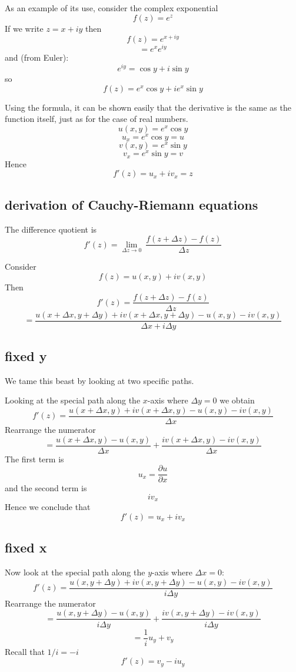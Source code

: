 \documentclass[11pt, oneside]{article}
\begin{document}
As an example of its use, consider the complex exponential
\[ f(z) = e^z \]
If we write $z = x + iy$ then
\[ f(z) = e^{x + iy} \]
\[ = e^x e^{iy} \]
and (from Euler):
\[ e^{iy} = \cos y + i \sin y \]
so
\[ f(z) = e^x \cos y + i e^x \sin y \]

Using the formula, it can be shown easily that the derivative is the same as the function itself, just as for the case of real numbers.
\[ u(x,y) = e^x \cos y \]
\[ u_x = e^x \cos y = u \]
\[ v(x,y) = e^x \sin y \]
\[ v_x = e^x \sin y = v \]
Hence
\[f'(z) = u_x + iv_x = z \]

\subsection*{derivation of Cauchy-Riemann equations}

The difference quotient is
\[ f'(z) = \lim_{\Delta z \rightarrow 0} \ \frac{f(z + \Delta z) - f(z)}{\Delta z} \]

Consider
\[ f(z) = u(x,y) + i v(x,y) \]
Then
\[ f'(z) = \frac{f(z + \Delta z) - f(z)}{\Delta z} \]
\[ = \frac{u(x + \Delta x, y + \Delta y) + i v (x + \Delta x, y + \Delta y) - u(x,y) - i v(x,y)}{\Delta x + i \Delta y} \]

\subsection*{fixed y}
We tame this beast by looking at two specific paths.

Looking at the special path along the $x$-axis where $\Delta y = 0$ we obtain
\[ f'(z) = \frac{u(x + \Delta x, y) + i v (x + \Delta x, y) - u(x,y) - i v(x,y)}{\Delta x} \]
Rearrange the numerator
\[ = \frac{u(x + \Delta x, y) - u(x,y)}{\Delta x} + \frac{i v (x + \Delta x, y) - i v(x,y)}{\Delta x} \]
The first term is
\[ u_x = \frac{\partial u}{\partial x} \]
and the second term is 
\[ i v_x \]
Hence we conclude that
\[ f'(z) = u_x + i v_x \]

\subsection*{fixed x}
Now look at the special path along the $y$-axis where $\Delta x = 0$:
\[ f'(z) = \frac{u(x, y + \Delta y) + i v (x, y + \Delta y) - u(x,y) - i v(x,y)}{i \Delta y} \]
Rearrange the numerator
\[ = \frac{u(x, y + \Delta y) - u(x,y)}{i \Delta y} + \frac{i v (x, y + \Delta y) - i v(x,y)}{i \Delta y} \]
\[ = \frac{1}{i} u_y + v_y \]
Recall that $1/i = -i$
\[ f'(z) = v_y - i u_y \]
\end{document}
